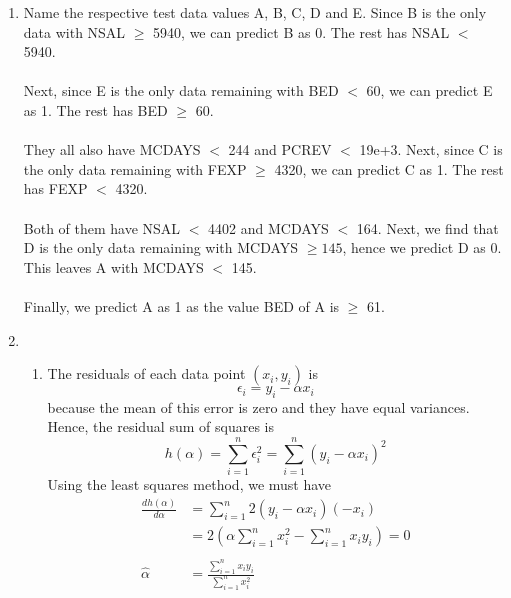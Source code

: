 \documentclass{article}
\begin{document}
\begin{enumerate}
    \item Name the respective test data values A, B, C, D and E. Since B is the only data with NSAL $\ge$ 5940, we can predict B as 0. The rest has NSAL $<$ 5940.\\\\
    Next, since E is the only data remaining with BED $<$ 60, we can predict E as 1. The rest has BED $\ge$ 60.\\\\
    They all also have MCDAYS $<$ 244 and PCREV $<$ 19e+3. Next, since C is the only data remaining with FEXP $\ge$ 4320, we can predict C as 1. The rest has FEXP $<$ 4320.\\\\
    Both of them have NSAL $<$ 4402 and MCDAYS $<$ 164. Next, we find that D is the only data remaining with MCDAYS $\ge 145$, hence we predict D as 0. This leaves A with MCDAYS $<$ 145.\\\\
    Finally, we predict A as 1 as the value BED of A is $\ge$ 61.
    
    \item
    \begin{enumerate}
        \item
        The residuals of each data point $(x_i,y_i)$ is \[\epsilon_i = y_i-\alpha x_i\] because the mean of this error is zero and they have equal variances.
        Hence, the residual sum of squares is
        \[ h(\alpha) = \sum_{i=1}^{n} \epsilon_i^2 = \sum_{i=1}^{n} (y_i-\alpha x_i)^2\]
        Using the least squares method, we must have
        \begin{align*}
            \frac{dh(\alpha)}{d\alpha}&=\sum_{i=1}^{n} 2(y_i-\alpha x_i)(-x_i)\\
            &=2\left(\alpha\sum_{i=1}^{n} x_i^2-\sum_{i=1}^{n} x_iy_i\right) = 0\\\\
            \hat{\alpha} &= \frac{\sum_{i=1}^{n} x_iy_i}{\sum_{i=1}^{n} x_i^2}
        \end{align*}
        

\end{enumerate}
\end{enumerate}
\end{document}
